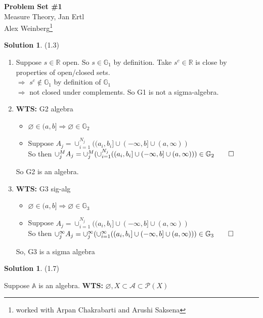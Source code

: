\documentclass[letterpaper,12pt]{article}
\theoremstyle{definition}
\newtheorem{solution}[theorem]{Solution}
\begin{document}
\begin{flushleft}
  \textbf{\large{Problem Set \#1}} \\
  Measure Theory, Jan Ertl \\
  Alex Weinberg\footnote{worked with Arpan Chakrabarti and Arushi Saksena}
\end{flushleft}

\vspace{5mm}

\begin{solution}(1.3)
  \begin{enumerate}
  \item
  Suppose $s \in \mathbb{R} $ open. So $s \in \mathbb{G}_1$ by definition. Take $s^c \in \mathbb{R}$ is close by properties of open/closed sets. \\
  $\Rightarrow$ $s^c \not \in \mathbb{G}_1$ by definition of $\mathbb{G}_1$ \\
  $\Rightarrow$ not closed under complements. So G1 is not a sigma-algebra.

  \item \textbf{WTS:} G2 algebra
  \begin{itemize}
  \item $\varnothing \in (a,b] \Rightarrow \varnothing \in \mathbb{G}_2 $
  \item Suppose $A_j = \cup_{i=1}^{N_j} ((a_i,b_i] \cup (-\infty,b] \cup (a,\infty))$ \\
  So then $\cup_j^M A_j = \cup_j^M (\cup_{i=1}^{N_j} ((a_i,b_i] \cup (-\infty,b] \cup (a,\infty))) \in \mathbb{G}_2 \qed$
  \end{itemize}
  So G2 is an algebra.

  \item \textbf{WTS:} G3 sig-alg
  \begin{itemize}
    \item $\varnothing \in (a,b] \Rightarrow \varnothing \in \mathbb{G}_3 $
    \item Suppose $A_j = \cup_{i=1}^{N_j} ((a_i,b_i] \cup (-\infty,b] \cup (a,\infty))$ \\
    So then $\cup_j^\infty A_j = \cup_j^\infty (\cup_{i=1}^{\infty} ((a_i,b_i] \cup (-\infty,b] \cup (a,\infty))) \in \mathbb{G}_3 \qed$
  \end{itemize}
  So, G3 is a sigma algebra
  \end{enumerate}
\end{solution}

\begin{solution} (1.7)

Suppose $\mathbb{A}$ is an algebra. \textbf{WTS:} ${\varnothing,X} \subset \mathcal{A} \subset \mathcal{P}(X)$

\end{solution}
\end{document}
